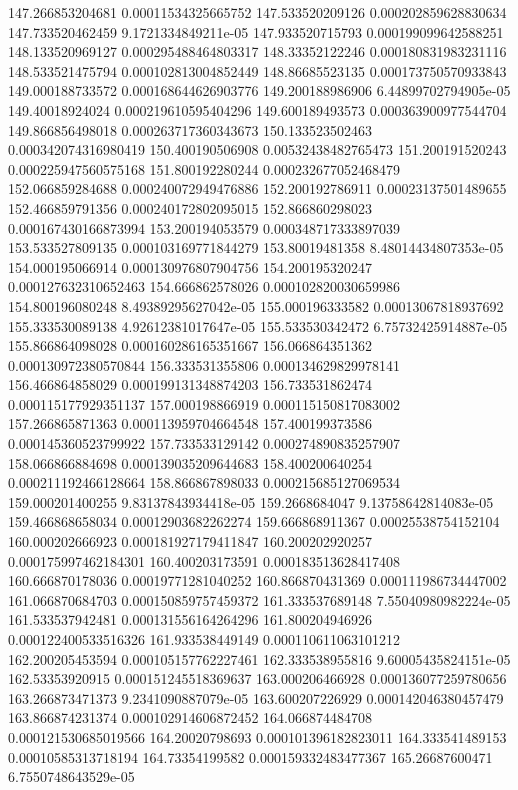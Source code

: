 {147.266853204681 0.00011534325665752
147.533520209126 0.000202859628830634
147.733520462459 9.1721334849211e-05
147.933520715793 0.000199099642588251
148.133520969127 0.000295488464803317
148.33352122246 0.000180831983231116
148.533521475794 0.000102813004852449
148.86685523135 0.000173750570933843
149.000188733572 0.000168644626903776
149.200188986906 6.44899702794905e-05
149.40018924024 0.000219610595404296
149.600189493573 0.000363900977544704
149.866856498018 0.000263717360343673
150.133523502463 0.000342074316980419
150.400190506908 0.00532438482765473
151.200191520243 0.000225947560575168
151.800192280244 0.000232677052468479
152.066859284688 0.000240072949476886
152.200192786911 0.00023137501489655
152.466859791356 0.000240172802095015
152.866860298023 0.000167430166873994
153.200194053579 0.000348717333897039
153.533527809135 0.000103169771844279
153.80019481358 8.48014434807353e-05
154.000195066914 0.000130976807904756
154.200195320247 0.000127632310652463
154.666862578026 0.000102820030659986
154.800196080248 8.49389295627042e-05
155.000196333582 0.00013067818937692
155.333530089138 4.92612381017647e-05
155.533530342472 6.75732425914887e-05
155.866864098028 0.000160286165351667
156.066864351362 0.000130972380570844
156.333531355806 0.000134629829978141
156.466864858029 0.000199131348874203
156.733531862474 0.000115177929351137
157.000198866919 0.000115150817083002
157.266865871363 0.000113959704664548
157.400199373586 0.000145360523799922
157.733533129142 0.000274890835257907
158.066866884698 0.000139035209644683
158.400200640254 0.000211192466128664
158.866867898033 0.000215685127069534
159.000201400255 9.83137843934418e-05
159.2668684047 9.13758642814083e-05
159.466868658034 0.00012903682262274
159.666868911367 0.00025538754152104
160.000202666923 0.000181927179411847
160.200202920257 0.000175997462184301
160.400203173591 0.000183513628417408
160.666870178036 0.00019771281040252
160.866870431369 0.000111986734447002
161.066870684703 0.000150859757459372
161.333537689148 7.55040980982224e-05
161.533537942481 0.000131556164264296
161.800204946926 0.000122400533516326
161.933538449149 0.000110611063101212
162.200205453594 0.000105157762227461
162.333538955816 9.60005435824151e-05
162.53353920915 0.000151245518369637
163.000206466928 0.000136077259780656
163.266873471373 9.2341090887079e-05
163.600207226929 0.000142046380457479
163.866874231374 0.000102914606872452
164.066874484708 0.000121530685019566
164.20020798693 0.000101396182823011
164.333541489153 0.00010585313718194
164.73354199582 0.000159332483477367
165.26687600471 6.7550748643529e-05
}
